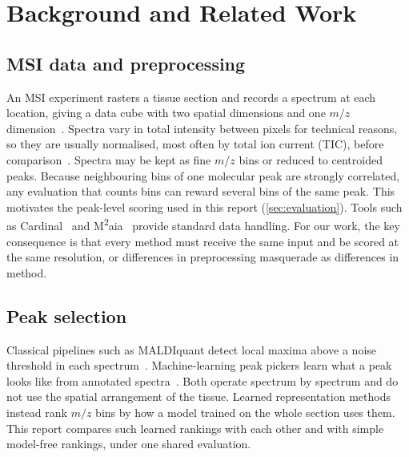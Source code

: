 \section{Background and Related Work}
\label{sec:background}

\subsection{MSI data and preprocessing}
An MSI experiment rasters a tissue section and records a spectrum at each
location, giving a data cube with two spatial dimensions and one $m/z$
dimension~\citep{caprioli1997maldi,buchberger2018mass}. Spectra vary in total
intensity between pixels for technical reasons, so they are usually
normalised, most often by total ion current (TIC), before
comparison~\citep{deininger2011normalization}. Spectra may be kept as fine
$m/z$ bins or reduced to centroided peaks. Because neighbouring bins of one
molecular peak are strongly correlated, any evaluation that counts bins can
reward several bins of the same peak. This motivates the peak-level scoring
used in this report (\cref{sec:evaluation}). Tools such as
Cardinal~\citep{bemis2015cardinal} and M\textsuperscript{2}aia~\citep{cordes2021m2aia}
provide standard data handling.
For our work, the key consequence is that every method must receive the same
input and be scored at the same resolution, or differences in preprocessing
masquerade as differences in method.

\subsection{Peak selection}
Classical pipelines such as MALDIquant detect local maxima above a noise
threshold in each spectrum~\citep{gibb2012maldiquant}. Machine-learning peak
pickers learn what a peak looks like from annotated
spectra~\citep{li2022machinelearningpeakpicking}. Both operate spectrum by
spectrum and do not use the spatial arrangement of the tissue. Learned
representation methods instead rank $m/z$ bins by how a model trained on the
whole section uses them. This report compares such learned rankings with each
other and with simple model-free rankings, under one shared evaluation.

